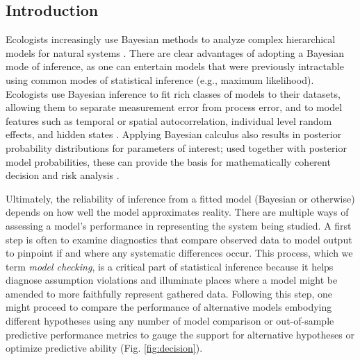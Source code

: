\documentclass[12pt,english]{article}
\begin{document}
\begin{spacing}{1.9}
\def\VAR{{\rm Var}\,} \def\COV{{\rm Cov}\,} \def\Prob{{\rm P}\,}
\def\bfx{{\bf x}} \def\bfX{{\bf X}} \def\bfY{{\bf Y}\,} \def\bfy{{\bf
    y}} \def\bfZ{{\bf Z}\,} \def\bftheta{\boldsymbol{\theta}}
\def\bfeta{\boldsymbol{\eta}} \def\bfOmega{\boldsymbol{\Omega}}
\def\bfbeta{\boldsymbol{\beta}} \def\bfSigma{\boldsymbol{\Sigma}}
\def\bfmu{\boldsymbol{\mu}} \def\bfnu{\boldsymbol{\nu}}
\def\bfepsilon{\boldsymbol{\epsilon}} \def\R2{\rm I\!R^2}


\section{Introduction}

Ecologists increasingly use Bayesian methods to analyze complex
hierarchical models for natural systems \citep{HobbsHooten2015}.
There are clear advantages of adopting a Bayesian mode of inference,
as one can entertain models that were previously intractable using
common modes of statistical inference (e.g., maximum
likelihood). Ecologists use Bayesian inference to fit rich classes of
models to their datasets, allowing them to separate measurement error
from process error, and to model features such as temporal or spatial
autocorrelation, individual level random effects, and hidden states
\citep{LinkEtAl2002,ClarkBjornstad2004,CressieEtAl2009}. Applying
Bayesian calculus also results in posterior probability distributions
for parameters of interest; used together with posterior model
probabilities, these can provide the basis for mathematically coherent
decision and risk analysis \citep{LinkBarker2006,Berger2013,
  williams2016combining}.

Ultimately, the reliability of inference from a fitted model (Bayesian
or otherwise) depends on how well the model approximates reality.
There are multiple ways of assessing a model's performance in
representing the system being studied. A first step is often to
examine diagnostics that compare observed data to model output to
pinpoint if and where any systematic differences occur. This process,
which we term \textit{model checking}, is a critical part of
statistical inference because it helps diagnose assumption violations and illuminate places where a model might be amended to more faithfully
represent gathered data. Following this step, one might proceed to
compare the performance of alternative models embodying different
hypotheses using any number of model comparison or out-of-sample
predictive performance metrics \citep[see][for a
review]{HootenHobbs2015} to gauge the support for alternative
hypotheses or optimize predictive ability (Fig. \ref{fig:decision}).


\end{spacing}
\end{document}
